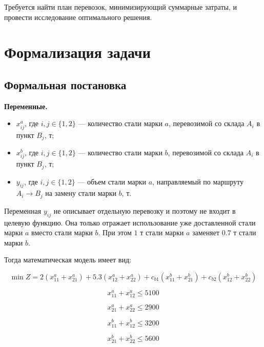 \documentclass[a4paper,12pt]{article}
\begin{document}
Требуется найти план перевозок, минимизирующий суммарные затраты, и провести исследование оптимального решения.

\section{Формализация задачи}

\subsection{Формальная постановка}

\textbf{Переменные.}

\begin{itemize}
    \item $x_{ij}^a$, где $i,j \in \{1,2\}$ --- количество стали марки $a$,
    перевозимой со склада $A_i$ в пункт $B_j$, т;
    \item $x_{ij}^b$, где $i,j \in \{1,2\}$ --- количество стали марки $b$,
    перевозимой со склада $A_i$ в пункт $B_j$, т;
    \item $y_{ij}$, где $i,j \in \{1,2\}$ --- объем стали марки $a$,
    направляемый по маршруту $A_i \to B_j$ на замену стали марки $b$, т.
\end{itemize}

Переменная $y_{ij}$ не описывает отдельную перевозку и поэтому не входит в
целевую функцию. Она только отражает использование уже доставленной стали
марки $a$ вместо стали марки $b$. При этом $1$ т стали марки $a$ заменяет
$0.7$ т стали марки $b$.

Тогда математическая модель имеет вид:

\begin{equation}
\min Z =
2(x_{11}^a + x_{21}^a) +
5.3(x_{12}^a + x_{22}^a) +
c_{b1}(x_{11}^b + x_{21}^b) +
c_{b2}(x_{12}^b + x_{22}^b)
\end{equation}

\begin{equation}
x_{11}^a + x_{12}^a \le 5100
\end{equation}

\begin{equation}
x_{21}^a + x_{22}^a \le 2900
\end{equation}

\begin{equation}
x_{11}^b + x_{12}^b \le 3200
\end{equation}

\begin{equation}
x_{21}^b + x_{22}^b \le 5600
\end{equation}
\end{document}
